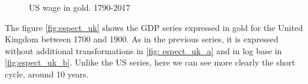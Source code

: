 \documentclass[a4paper]{article}
\begin{document}
\begin{figure}[H]
	\centering
	\caption{US wage in gold. 1790-2017} \label{fig:espect_wg}
\end{figure}

The figure \ref{fig:espect_uk} shows the GDP series expressed in gold for the United Kingdom between 1700 and 1900. As in the previous series, it is expressed without additional transformations in \ref{fig: espect_uk_a} and in log base in \ref{fig:espect_uk_b}. Unlike the US series, here we can see more clearly the short cycle, around 10 years.
\end{document}
